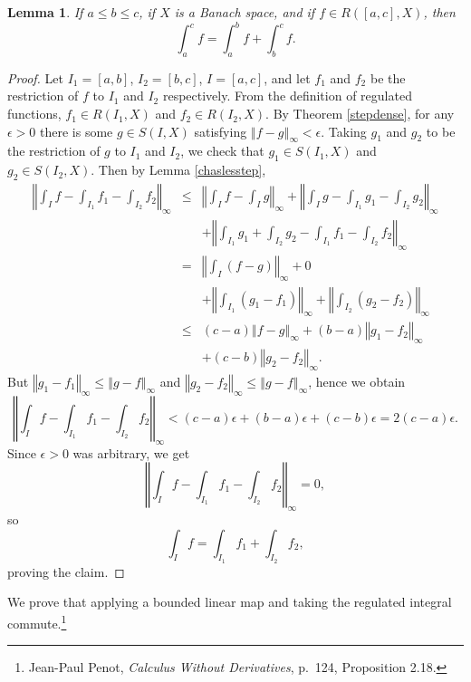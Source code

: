 \documentclass{article}
\newcommand{\norm}[1]{\left\Vert #1 \right\Vert}
\newtheorem{lemma}[theorem]{Lemma}
\theoremstyle{definition}
\begin{document}
\begin{lemma}
If $a \leq b \leq c$, if $X$ is a Banach space, and if $f \in R([a,c],X)$, then
\[
\int_a^c f = \int_a^b f + \int_b^c f.
\]
\label{chaslesregulated}
\end{lemma}
\begin{proof}
Let $I_1=[a,b]$, $I_2=[b,c]$, $I=[a,c]$, and let $f_1$ and $f_2$ be the restriction of $f$ to $I_1$ and $I_2$ respectively. 
From the definition of regulated functions, $f_1 \in R(I_1,X)$ and $f_2 \in R(I_2,X)$.
By Theorem \ref{stepdense},
for any $\epsilon>0$ there is
some $g \in S(I,X)$ satisfying $\norm{f-g}_\infty<\epsilon$. Taking $g_1$ and $g_2$ to be the restriction of $g$
to $I_1$ and $I_2$, we check that $g_1 \in S(I_1,X)$ and $g_2 \in S(I_2,X)$. Then by Lemma \ref{chaslesstep}, 
\begin{eqnarray*}
\norm{\int_I f - \int_{I_1}f_1 -\int_{I_2}f_2}_\infty&\leq&\norm{\int_I f - \int_I g}_\infty + \norm{\int_I g -\int_{I_1} g_1 - \int_{I_2} g_2}_\infty\\
&&+\norm{\int_{I_1} g_1 + \int_{I_2} g_2 - \int_{I_1}f_1 -\int_{I_2}f_2}_\infty\\
&=&\norm{\int_I (f-g)}_\infty + 0\\
&&+\norm{\int_{I_1}(g_1-f_1)}_\infty + \norm{\int_{I_2}(g_2-f_2)}_\infty\\
&\leq&(c-a)\norm{f-g}_\infty + (b-a)\norm{g_1-f_2}_\infty \\
&&+ (c-b)\norm{g_2-f_2}_\infty.
\end{eqnarray*}
But $\norm{g_1-f_1}_\infty \leq \norm{g-f}_\infty$ and $\norm{g_2-f_2}_\infty \leq \norm{g-f}_\infty$, hence we obtain
\[
\norm{\int_I f - \int_{I_1}f_1 -\int_{I_2}f_2}_\infty < (c-a)\epsilon+(b-a)\epsilon+(c-b)\epsilon = 2(c-a)\epsilon.
\]
Since $\epsilon>0$ was arbitrary, we get
\[
\norm{\int_I f - \int_{I_1}f_1 -\int_{I_2}f_2}_\infty = 0,
\]
so
\[
\int_I f = \int_{I_1}f_1 + \int_{I_2}f_2,
\]
proving the claim.
\end{proof}

We prove that applying a bounded linear map and taking the regulated integral commute.\footnote{Jean-Paul Penot, {\em Calculus Without Derivatives}, p.~124, Proposition 2.18.}
\end{document}

